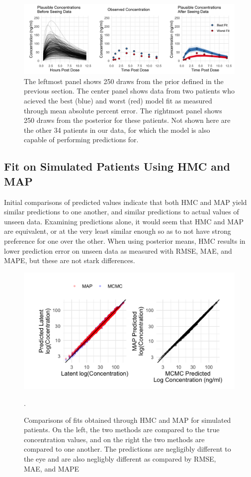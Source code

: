 \begin{figure}
	\centering
	\includegraphics[width=\linewidth]{figs/fig3}
	\caption{The leftmost panel shows 250 draws from the prior defined in the previous section.  The center panel shows data from two patients who acieved the best (blue) and worst (red) model fit as measured through mean absolute percent error.  The rightmost panel shows 250 draws from the posterior for these patients.  Not shown here are the other 34 patients in our data, for which the model is also capable of performing predictions for. }
	\label{fig:fig4}
\end{figure}


\subsection*{Fit on Simulated Patients Using HMC and MAP}

Initial comparisons of predicted values indicate that both HMC and MAP yield similar predictions to one another, and similar predictions to actual values of unseen data.  Examining predictions alone, it would seem that HMC and MAP are equivalent, or at the very least similar enough so as to not have strong preference for one over the other. When using posterior means, HMC results in lower prediction error on unseen data as measured with RMSE, MAE, and MAPE, but these are not stark differences.

\begin{figure}
	\centering
	\includegraphics[width=0.85\linewidth]{figs/compare}
	\caption{Comparisons of fits obtained through HMC and MAP for simulated patients.  On the left, the two methods are compared to the true concentration values, and on the right the two methods are compared to one another.  The predictions are negligibly different to the eye and are also negligbly different as compared by RMSE, MAE, and MAPE}.
	\label{fig:fig5}
\end{figure}


